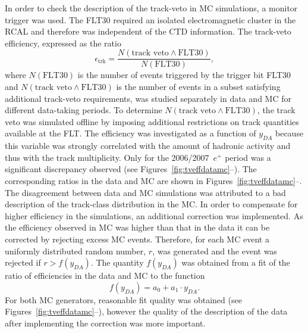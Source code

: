 In order to check the description of the track-veto in MC simulations, a monitor trigger was used. The FLT30 required an isolated electromagnetic cluster in the RCAL and therefore was independent of the CTD information. The track-veto efficiency, expressed as the ratio
\begin{equation}
 \epsilon_\mathrm{trk} = \frac{N\left(\text{track veto} \wedge \text{FLT30}\right)}{N\left(\text{FLT30}\right)},
\end{equation}
where $N\left(\text{FLT30}\right)$ is the number of events triggered by the trigger bit FLT30 and $N\left(\text{track veto} \wedge \text{FLT30}\right)$ is the number of events in a subset satisfying additional track-veto requirements, was studied separately in data and MC for different data-taking periods. To determine $N\left(\text{track veto} \wedge \text{FLT30}\right)$, the track veto was simulated offline by imposing additional restrictions on track quantities available at the FLT. The efficiency was investigated as a function of $y_{DA}$ because this variable was strongly correlated with the amount of hadronic activity and thus with the track multiplicity. Only for the 2006/2007~$e^+$ period was a significant discrepancy observed (see Figures~\ref{fig:tveffdatamc}--). The corresponding ratios in the data and MC are shown in Figures~\ref{fig:tveffdatamc}--. The disagreement between data and MC simulations was attributed to a bad description of the track-class distribution in the MC. In order to compensate for higher efficiency in the simulations, an additional correction was implemented. As the efficiency observed in MC was higher than that in the data it can be corrected by rejecting excess MC events. Therefore, for each MC event a uniformly distributed random number, $r$, was generated and the event was rejected if $r > f\left(y_{DA}\right)$. The quantity $f\left(y_{DA}\right)$ was obtained from a fit of the ratio of efficiencies in the data and MC to the function
\begin{equation} 
 f\left(y_{DA}\right)=a_0 + a_1 \cdot y_{DA}.
\end{equation}
For both MC generators, reasonable fit quality was obtained (see Figures~\ref{fig:tveffdatamc}--), however the quality of the description of the data after implementing the correction was more important.

